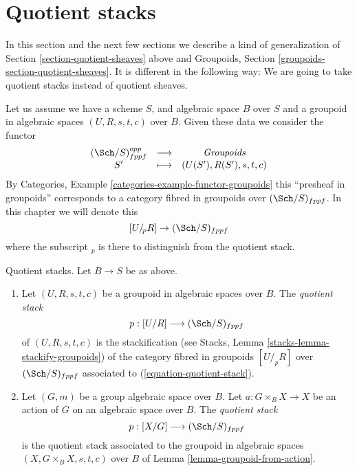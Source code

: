 \section{Quotient stacks}
\label{section-stacks}

\noindent
In this section and the next few sections we describe a kind of
generalization of
Section \ref{section-quotient-sheaves}
above and
Groupoids, Section \ref{groupoids-section-quotient-sheaves}.
It is different in the following way:
We are going to take quotient stacks instead of quotient sheaves.

\medskip\noindent
Let us assume we have a scheme $S$, and algebraic space $B$ over $S$
and a groupoid in algebraic spaces $(U, R, s, t, c)$ over $B$. Given these data
we consider the functor
\begin{equation}
\label{equation-quotient-stack}
\begin{matrix}
(\Sch/S)_{fppf}^{opp} &
\longrightarrow &
\textit{Groupoids} \\
S' &
\longmapsto &
(U(S'), R(S'), s, t, c)
\end{matrix}
\end{equation}
By
Categories, Example \ref{categories-example-functor-groupoids}
this ``presheaf in groupoids'' corresponds to a category fibred in groupoids
over $(\Sch/S)_{fppf}$. In this chapter we will denote
this
$$
[U/_{\!p}R] \to (\Sch/S)_{fppf}
$$
where the subscript ${}_p$ is there to distinguish from the quotient stack.

\begin{definition}
\label{definition-quotient-stack}
Quotient stacks. Let $B \to S$ be as above.
\begin{enumerate}
\item Let $(U, R, s, t, c)$ be a groupoid in algebraic spaces over $B$.
The {\it quotient stack}
$$
p : [U/R] \longrightarrow (\Sch/S)_{fppf}
$$
of $(U, R, s, t, c)$ is the stackification (see
Stacks, Lemma \ref{stacks-lemma-stackify-groupoids})
of the category fibred in groupoids $[U/_{\!p}R]$ over
$(\Sch/S)_{fppf}$ associated to
(\ref{equation-quotient-stack}).
\item Let $(G, m)$ be a group algebraic space over $B$.
Let $a : G \times_B X \to X$ be an action of $G$ on an algebraic space
over $B$. The {\it quotient stack}
$$
p : [X/G] \longrightarrow (\Sch/S)_{fppf}
$$
is the quotient stack associated to the groupoid in algebraic spaces
$(X, G \times_B X, s, t, c)$ over $B$ of
Lemma \ref{lemma-groupoid-from-action}.
\end{enumerate}
\end{definition}

